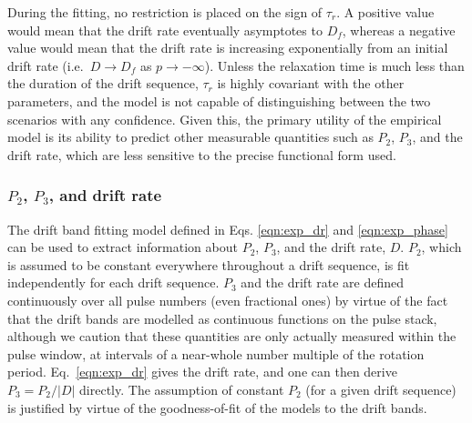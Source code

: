\documentclass[linenumbers]{aastex631}
\begin{document}
During the fitting, no restriction is placed on the sign of $\tau_r$.
A positive value would mean that the drift rate eventually asymptotes to $D_f$, whereas a negative value would mean that the drift rate is increasing exponentially from an initial drift rate (i.e.\  $D\rightarrow D_f$ as $p\rightarrow -\infty$).
Unless the relaxation time is much less than the duration of the drift sequence, $\tau_r$ is highly covariant with the other parameters, and the model is not capable of distinguishing between the two scenarios with any confidence.
Given this, the primary utility of the empirical model is its ability to predict other measurable quantities such as $P_2$, $P_3$, and the drift rate, which are less sensitive to the precise functional form used.

\subsubsection{$P_2$, $P_3$, and drift rate}
\label{sec:P2P3DR}

The drift band fitting model defined in Eqs. \eqref{eqn:exp_dr} and \eqref{eqn:exp_phase} can be used to extract information about $P_2$, $P_3$, and the drift rate, $D$.
$P_2$, which is assumed to be constant everywhere throughout a drift sequence, is fit independently for each drift sequence.
$P_3$ and the drift rate are defined continuously over all pulse numbers (even fractional ones) by virtue of the fact that the drift bands are modelled as continuous functions on the pulse stack, although we caution that these quantities are only actually measured within the pulse window, at intervals of a near-whole number multiple of the rotation period.
Eq.~\eqref{eqn:exp_dr} gives the drift rate, and one can then derive $P_3 = P_2/|D|$ directly.
The assumption of constant $P_2$ (for a given drift sequence) is justified by virtue of the goodness-of-fit of the models to the drift bands.
\end{document}
